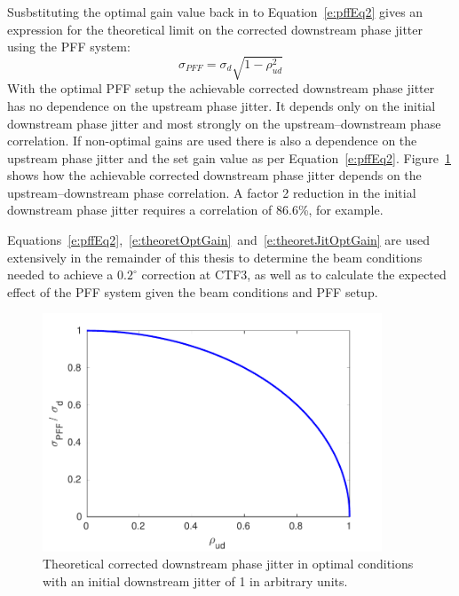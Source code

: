Susbstituting the optimal gain value back in to Equation~\ref{e:pffEq2} gives an expression for the theoretical limit on the corrected downstream phase jitter using the PFF system:
\begin{equation}
\sigma_{PFF} = \sigma_d\sqrt{1-\rho_{ud}^2}
\label{e:theoretJitOptGain}
\end{equation}
With the optimal PFF setup the achievable corrected downstream phase jitter has no dependence on the upstream phase jitter. It depends only on the initial downstream phase jitter and most strongly on the upstream--downstream phase correlation. If non-optimal gains are used there is also a dependence on the upstream phase jitter and the set gain value as per Equation~\ref{e:pffEq2}. Figure~\ref{f:theoretJitvsCorr} shows how the achievable corrected downstream phase jitter depends on the upstream--downstream phase correlation. A factor 2 reduction in the initial downstream phase jitter requires a correlation of 86.6\%, for example.

Equations~\ref{e:pffEq2},~\ref{e:theoretOptGain}~and~\ref{e:theoretJitOptGain} are used extensively in the remainder of this thesis to determine the beam conditions needed to achieve a \(0.2^\circ\) correction at CTF3, as well as to calculate the expected effect of the PFF system given the beam conditions and PFF setup.

\begin{figure}
  \centering
  \includegraphics[width=0.9\textwidth]{Figures/propagation/theoretJitvsCorr}
  \caption{Theoretical corrected downstream phase jitter in optimal conditions with an initial downstream jitter of 1 in arbitrary units.}
  \label{f:theoretJitvsCorr}
\end{figure}

